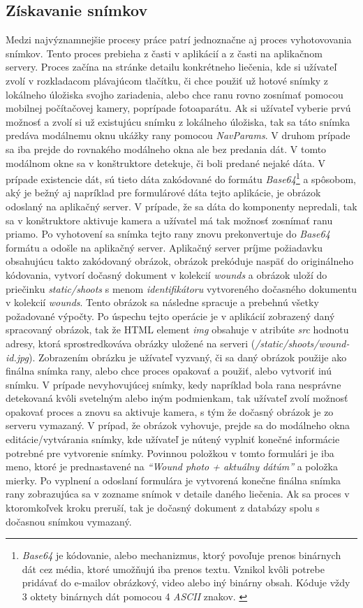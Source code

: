 \subsection{Získavanie snímkov}
Medzi najvýznamnejšie procesy práce patrí jednoznačne aj proces vyhotovovania snímkov. Tento proces prebieha z časti v aplikácií a z časti na aplikačnom servery. Proces začína na stránke detailu konkrétneho liečenia, kde si užívateľ zvolí v rozkladacom plávajúcom tlačítku, či chce použiť už hotové snímky z lokálneho úložiska svojho zariadenia, alebo chce ranu rovno zosnímať pomocou mobilnej počítačovej kamery, poprípade fotoaparátu. Ak si užívateľ vyberie prvú možnosť a zvolí si už existujúcu snímku z lokálneho úložiska, tak sa táto snímka predáva modálnemu oknu ukážky rany pomocou \textit{NavParams}. V druhom prípade sa iba prejde do rovnakého modálneho okna ale bez predania dát. V tomto modálnom okne sa v konštruktore detekuje, či boli predané nejaké dáta. V prípade existencie dát, sú tieto dáta zakódované do formátu \textit{Base64}\footnote{\textit{Base64} je kódovanie, alebo mechanizmus, ktorý povoľuje prenos binárnych dát cez média, ktoré umožňujú iba prenos textu. Vznikol kvôli potrebe pridávať do e-mailov obrázkový, video alebo iný binárny obsah. Kóduje vždy 3 oktety binárnych dát pomocou 4 \textit{ASCII} znakov. \cite{Menon13122008}} a spôsobom, aký je bežný aj napríklad pre formulárové dáta tejto aplikácie, je obrázok odoslaný na aplikačný server. V prípade, že sa dáta do komponenty nepredali, tak sa v konštruktore aktivuje kamera a užívatel má tak možnosť zosnímať ranu priamo. Po vyhotovení sa snímka tejto rany znovu prekonvertuje do \textit{Base64} formátu a odošle na aplikačný server. Aplikačný server príjme požiadavku obsahujúcu takto zakódovaný obrázok, obrázok prekóduje naspäť do originálneho kódovania, vytvorí dočasný dokument v kolekcií \textit{wounds} a obrázok uloží do priečinku \textit{static/shoots} s menom \textit{identifikátoru} vytvoreného dočasného dokumentu v kolekcií \textit{wounds}. Tento obrázok sa následne spracuje a prebehnú všetky požadované výpočty. Po úspechu tejto operácie je v aplikácií zobrazený daný spracovaný obrázok, tak že HTML element \textit{img} obsahuje v atribúte \textit{src} hodnotu adresy, ktorá sprostredkováva obrázky uložené na serveri (\textit{/static/shoots/wound-id.jpg}). Zobrazením obrázku je užívateľ vyzvaný, či sa daný obrázok použije ako finálna snímka rany, alebo chce proces opakovať a použiť, alebo vytvoriť inú snímku. V prípade nevyhovujúcej snímky, kedy napríklad bola rana nesprávne detekovaná kvôli svetelným alebo iným podmienkam, tak užívateľ zvolí možnosť opakovať proces a znovu sa aktivuje kamera, s tým že dočasný obrázok je zo serveru vymazaný. V prípad, že obrázok vyhovuje, prejde sa do modálneho okna editácie/vytvárania snímky, kde užívateľ je nútený vyplniť konečné informácie potrebné pre vytvorenie snímky. Povinnou položkou v tomto formulári je iba meno, ktoré je prednastavené na \textit{“Wound photo + aktuálny dátúm”} a položka mierky. Po vyplnení a odoslaní formulára je vytvorená konečne finálna snímka rany zobrazujúca sa v zozname snímok v detaile daného liečenia. Ak sa proces v ktoromkoľvek kroku preruší, tak je dočasný dokument z databázy spolu s dočasnou snímkou vymazaný.

